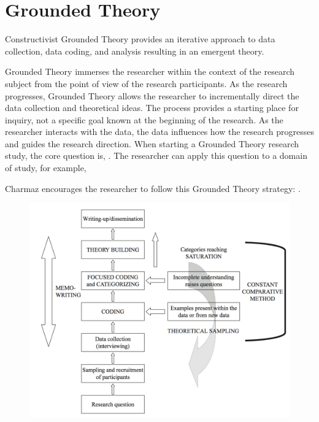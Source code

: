 
\chapter{Grounded Theory}
\label{ConstructivistGroundedTheoryChapter}
Constructivist Grounded Theory \cite{Charmaz} provides an iterative approach to data collection, data coding, and analysis resulting in an emergent theory. 

Grounded Theory immerses the researcher within the context of the research subject from the point of view of the research participants. As the research progresses, Grounded Theory allows the researcher to incrementally direct the data collection and theoretical ideas. The process provides a starting place for inquiry, not a specific goal known at the beginning of the research. As the researcher interacts with the data, the data influences how the research progresses and guides the research direction. When starting a Grounded Theory research study, the core question is,  \cite{GlaserTheoreticalSensitivity}. The researcher can apply this question to a domain of study, for example, 

Charmaz encourages the researcher to follow this Grounded Theory strategy:  \cite{Charmaz}.

\begin{figure}[t]
\centering
\includegraphics[width=6.4in]{grounded_theory_images/tweed_grounded_theory.png}
\label{TweedVisualizationGroundedTheory}
\end{figure}

